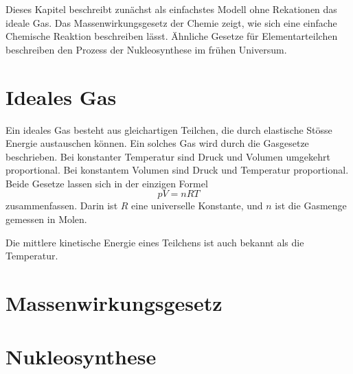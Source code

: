 Dieses Kapitel beschreibt zunächst als einfachstes Modell ohne
Rekationen das ideale Gas.
Das Massenwirkungsgesetz der Chemie zeigt, wie sich eine einfache
Chemische Reaktion beschreiben lässt.
Ähnliche Gesetze für Elementarteilchen beschreiben den Prozess 
der Nukleosynthese im frühen Universum.

\section{Ideales Gas}
Ein ideales Gas besteht aus gleichartigen Teilchen, die durch elastische
Stösse Energie austauschen können.
Ein solches Gas wird durch die Gasgesetze beschrieben.
Bei konstanter Temperatur sind Druck und Volumen umgekehrt
proportional.
Bei konstantem Volumen sind Druck und Temperatur proportional.
Beide Gesetze lassen sich in der einzigen Formel 
\[
pV=nRT
\]
zusammenfassen.
Darin ist  $R$ eine universelle Konstante, und $n$ ist die Gasmenge
gemessen in Molen.

Die mittlere kinetische Energie eines Teilchens ist auch bekannt
als die Temperatur.


\section{Massenwirkungsgesetz}

\section{Nukleosynthese}

